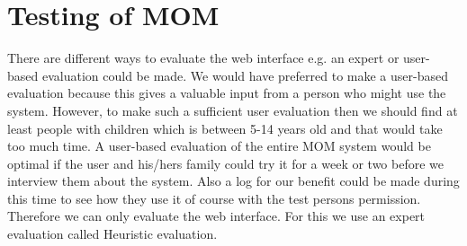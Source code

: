 \chapter{Testing of MOM}
There are different ways to evaluate the web interface e.g. an expert or user-based evaluation could be made. We would have preferred to make a user-based evaluation because this gives a valuable input from a person who might use the system. However, to make such a sufficient user evaluation then we should find at least people with children which is between 5-14 years old and that would take too much time. A user-based evaluation of the entire MOM system would be optimal if the user and his/hers family could try it for a week or two before we interview them about the system. Also a log for our benefit could be made during this time to see how they use it of course with the test persons permission. Therefore we can only evaluate the web interface. For this we use an expert evaluation called Heuristic evaluation. 

